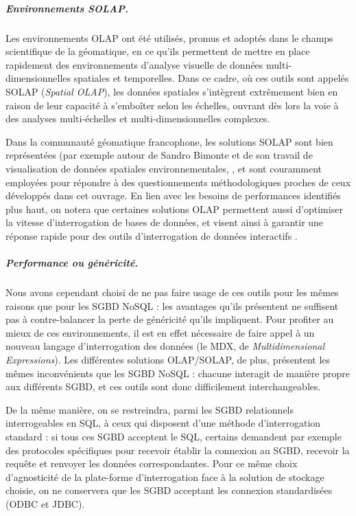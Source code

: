 \subparagraph{Environnements SOLAP.}
Les environnements OLAP ont été utilisés, promus et adoptés dans le champs scientifique de la géomatique, en ce qu'ils permettent de mettre en place rapidement des environnements d'analyse visuelle de données multi-dimensionnelles spatiales et temporelles.
Dans ce cadre, où ces outils sont appelés \og SOLAP\fg{} (\textit{Spatial OLAP}), les données spatiales s'intègrent extrêmement bien en raison de leur capacité à s'emboîter selon les échelles, ouvrant dès lors la voie à des analyses multi-échelles et multi-dimensionnelles complexes.

Dans la communauté géomatique francophone, les solutions SOLAP sont bien représentées (par exemple autour de Sandro Bimonte et de son travail de visualisation de données spatiales environnementales,  \autocite{bimonte_integration_2007, bimonte_towards_2005, zaamoune_new_2013}, et sont couramment employées pour répondre à des questionnements méthodologiques proches de ceux développés dans cet ouvrage.
En lien avec les besoins de performances identifiés plus haut, on notera que certaines solutions OLAP permettent aussi d'optimiser la vitesse d'interrogation de bases de données, et visent ainsi à garantir une réponse rapide pour des outils d'interrogation de données interactifs \autocite{zeng_iolap_2016}.

\subparagraph{Performance ou généricité.}
Nous avons cependant choisi de ne pas faire usage de ces outils pour les mêmes raisons que pour les SGBD NoSQL : les avantages qu'ils présentent ne suffisent pas à contre-balancer la perte de généricité qu'ils impliquent.
Pour profiter au mieux de ces environnements, il est en effet nécessaire de faire appel à un nouveau langage d'interrogation des données (le \og MDX\fg{}, de \og \textit{Multidimensional Expressions}\fg{}).
Les différentes solutions OLAP/SOLAP, de plus, présentent les mêmes inconvénients que les SGBD NoSQL : chacune interagit de manière propre aux différents SGBD, et ces outils sont donc difficilement interchangeables.

De la même manière, on se restreindra, parmi les SGBD relationnels interrogeables en SQL, à ceux qui disposent d'une méthode d'interrogation standard : si tous ces SGBD acceptent le SQL, certains demandent par exemple des protocoles spécifiques pour recevoir établir la connexion au SGBD, recevoir la requête et renvoyer les données correspondantes.
Pour ce même choix \og d'agnosticité \fg{} de la plate-forme d'interrogation face à la solution de stockage choisie, on ne conservera que les SGBD acceptant les connexion standardisées (ODBC et JDBC).

